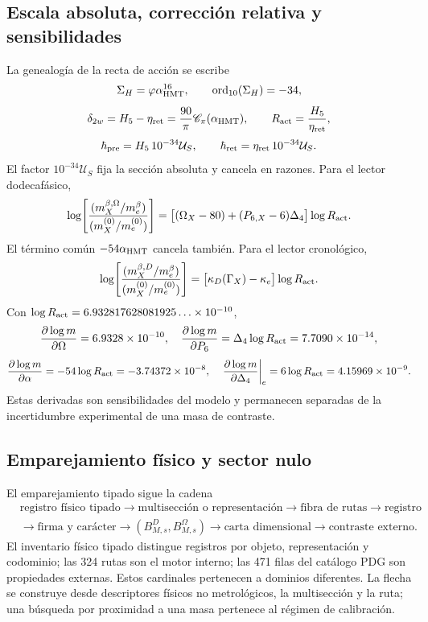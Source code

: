 \subsection{Escala absoluta, corrección relativa y sensibilidades}

La genealogía de la recta de acción se escribe
\[
 \Sigma_H=\varphi\alpha_{\rm HMT}^{16},
 \qquad \operatorname{ord}_{10}(\Sigma_H)=-34,
\]
\[
 \delta_{2w}=H_5-\eta_{\rm ret}
 =\frac{90}{\pi}\mathscr C_\pi(\alpha_{\rm HMT}),
 \qquad R_{\rm act}=\frac{H_5}{\eta_{\rm ret}},
\]
\[
 \hbar_{\rm pre}=H_5\,10^{-34}\mathcal U_S,
 \qquad
 \hbar_{\rm ret}=\eta_{\rm ret}\,10^{-34}\mathcal U_S.
\]
El factor \(10^{-34}\mathcal U_S\) fija la sección absoluta y cancela en
razones. Para el lector dodecafásico,
\begin{equation}
 \log\!\left[
 \frac{(m_X^{\beta,\Omega}/m_e^{\beta})}
 {(m_X^{(0)}/m_e^{(0)})}\right]
 =\bigl[(\Omega_X-80)+(P_{6,X}-6)\Delta_4\bigr]
 \log R_{\rm act}.
 \label{eq:razon-masa-omega-rev11}
\end{equation}
El término común \(-54\alpha_{\rm HMT}\) cancela también. Para el lector
cronológico,
\begin{equation}
 \log\!\left[
 \frac{(m_X^{\beta,D}/m_e^{\beta})}
 {(m_X^{(0)}/m_e^{(0)})}\right]
 =\bigl[\kappa_D(\Gamma_X)-\kappa_e\bigr]\log R_{\rm act}.
 \label{eq:razon-masa-D-rev11}
\end{equation}
Con \(\log R_{\rm act}=6.932817628081925\ldots\times10^{-10}\),
\[
 \frac{\partial\log m}{\partial\Omega}=6.9328\times10^{-10},
 \quad
 \frac{\partial\log m}{\partial P_6}
 =\Delta_4\log R_{\rm act}=7.7090\times10^{-14},
\]
\[
 \frac{\partial\log m}{\partial\alpha}
 =-54\log R_{\rm act}=-3.74372\times10^{-8},
 \quad
 \left.\frac{\partial\log m}{\partial\Delta_4}\right|_e
 =6\log R_{\rm act}=4.15969\times10^{-9}.
\]
Estas derivadas son sensibilidades del modelo y permanecen separadas de la
incertidumbre experimental de una masa de contraste.

\subsection{Emparejamiento físico y sector nulo}

El emparejamiento tipado sigue la cadena
\[
 \begin{aligned}
 &\text{registro físico tipado}
 \longrightarrow\text{multisección o representación}
 \longrightarrow\text{fibra de rutas}\longrightarrow\text{registro}\\
 &\longrightarrow\text{firma y carácter}
 \longrightarrow(B_{M,s}^D,B_{M,s}^\Omega)
 \longrightarrow\text{carta dimensional}
 \longrightarrow\text{contraste externo}.
 \end{aligned}
\]
El inventario físico tipado distingue registros por objeto, representación y codominio; las 324 rutas son
el motor interno; las 471 filas del catálogo PDG son propiedades externas.
Estos cardinales pertenecen a dominios diferentes. La flecha se construye
desde descriptores físicos no metrológicos, la multisección y la ruta; una
búsqueda por proximidad a una masa pertenece al régimen de calibración.

